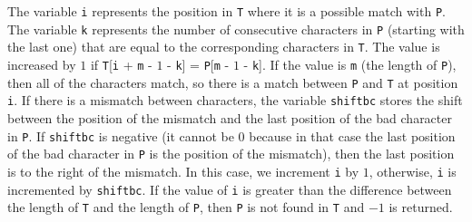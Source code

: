 The variable \texttt{i} represents the position in \texttt{T} where it is a possible match with \texttt{P}. The variable \texttt{k} represents the number of consecutive characters in \texttt{P} (starting with the last one) that are equal to the corresponding characters in \texttt{T}. The value is increased by \(1\) if \texttt{T}[\texttt{i} + \texttt{m} - \(1\) - \texttt{k}] = \texttt{P}[\texttt{m} - \(1\) - \texttt{k}]. If the value is \texttt{m} (the length of \texttt{P}), then all of the characters match, so there is a match between \texttt{P} and \texttt{T} at position \texttt{i}. If there is a mismatch between characters, the variable \texttt{shiftbc} stores the shift between the position of the mismatch and the last position of the bad character in \texttt{P}. If \texttt{shiftbc} is negative (it cannot be \(0\) because in that case the last position of the bad character in \texttt{P} is the position of the mismatch), then the last position is to the right of the mismatch. In this case, we increment \texttt{i} by \(1\), otherwise, \texttt{i} is incremented by \texttt{shiftbc}. If the value of \texttt{i} is greater than the difference between the length of \texttt{T} and the length of \texttt{P}, then \texttt{P} is not found in \texttt{T} and \(-1\) is returned.